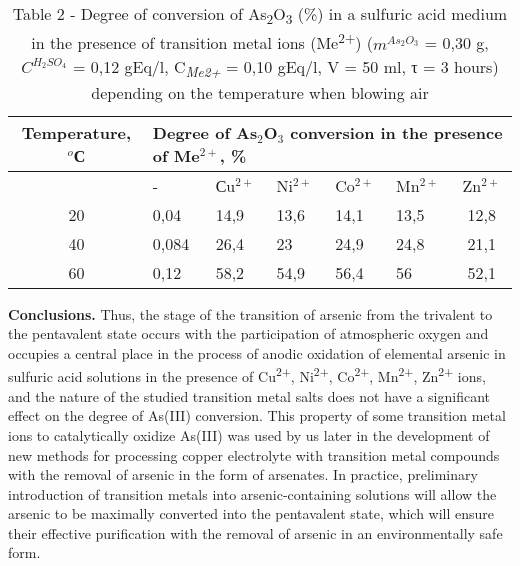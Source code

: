 \begin{table}[H]
\caption*{Table 2 - Degree of conversion of
As\textsubscript{2}O\textsubscript{3} (\%) in a sulfuric acid medium
in the presence of transition metal ions (Me\textsuperscript{2+})
($m^{As_2O_3}$ = 0,30 g, $C^{H_2SO_4}$ = 0,12 gEq/l,
C\emph{\textsubscript{Me2+}} = 0,10 gEq/l, V = 50 ml, τ = 3 hours)
depending on the temperature when blowing air}
\centering
\begin{tabular}{|c|cccccc|}
\hline
Temperature, $^o$С & \multicolumn{6}{l|}{Degree of As$_2$O$_3$ conversion in the presence of Me$^{2+}$, \%} \\ \hline
   & \multicolumn{1}{l|}{-}     & \multicolumn{1}{l|}{Сu$^{2+}$} & \multicolumn{1}{l|}{Ni$^{2+}$} & \multicolumn{1}{l|}{Co$^{2+}$} & \multicolumn{1}{l|}{Mn$^{2+}$} & Zn$^{2+}$ \\ \hline
20 & \multicolumn{1}{l|}{0,04}  & \multicolumn{1}{l|}{14,9} & \multicolumn{1}{l|}{13,6} & \multicolumn{1}{l|}{14,1} & \multicolumn{1}{l|}{13,5} & 12,8 \\ \hline
40 & \multicolumn{1}{l|}{0,084} & \multicolumn{1}{l|}{26,4} & \multicolumn{1}{l|}{23}   & \multicolumn{1}{l|}{24,9} & \multicolumn{1}{l|}{24,8} & 21,1 \\ \hline
60 & \multicolumn{1}{l|}{0,12}  & \multicolumn{1}{l|}{58,2} & \multicolumn{1}{l|}{54,9} & \multicolumn{1}{l|}{56,4} & \multicolumn{1}{l|}{56}   & 52,1 \\ \hline
\end{tabular}
\end{table}

\begin{multicols}{2}
{\bfseries Conclusions.} Thus, the stage of the transition of arsenic from
the trivalent to the pentavalent state occurs with the participation of
atmospheric oxygen and occupies a central place in the process of anodic
oxidation of elemental arsenic in sulfuric acid solutions in the
presence of Cu\textsuperscript{2+}, Ni\textsuperscript{2+},
Co\textsuperscript{2+}, Mn\textsuperscript{2+}, Zn\textsuperscript{2+}
ions, and the nature of the studied transition metal salts does not have
a significant effect on the degree of As(III) conversion. This property
of some transition metal ions to catalytically oxidize As(III) was used
by us later in the development of new methods for processing copper
electrolyte with transition metal compounds with the removal of arsenic
in the form of arsenates. In practice, preliminary introduction of
transition metals into arsenic-containing solutions will allow the
arsenic to be maximally converted into the pentavalent state, which will
ensure their effective purification with the removal of arsenic in an
environmentally safe form.
\end{multicols}

